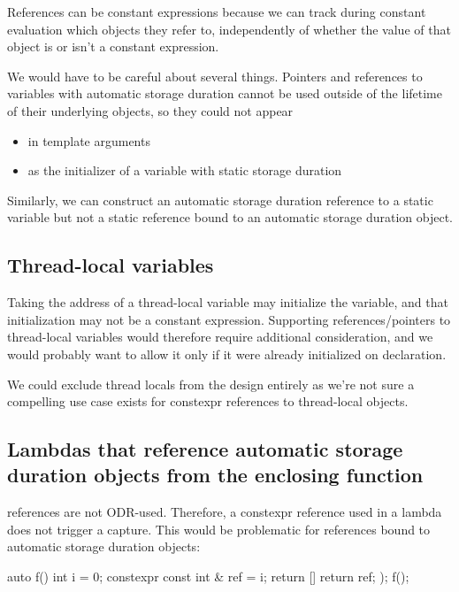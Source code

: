 \documentclass{wg21}
\begin{document}
References can be constant expressions because we can track during constant evaluation which objects they refer to, independently of whether the value of that object is or isn't a constant expression.

We would have to be careful about several things.
Pointers and references to variables with automatic storage duration cannot be used outside of the lifetime of their underlying objects, so they could not appear
\begin{itemize}
  \item in template arguments
  \item as the initializer of a variable with static storage duration
\end{itemize}

Similarly, we can construct an automatic storage duration  reference to a static variable but not a static  reference bound to an automatic storage duration object.

\subsection{Thread-local variables}

Taking the address of a thread-local variable may initialize the variable, and that initialization may not be a constant expression.
Supporting references/pointers to thread-local variables would therefore require additional consideration, and we would probably want to allow it only if it were  already initialized
on declaration.

We could exclude thread locals from the design entirely as we're not sure a compelling use case exists for constexpr references to thread-local objects.

\subsection{Lambdas that reference automatic storage duration objects from the enclosing function}

 references are not ODR-used.  Therefore, a constexpr reference used in a lambda does not trigger a capture.
This would be problematic for references bound to automatic storage duration objects:

\begin{colorblock}
auto f() {
    int i = 0;
    constexpr const int & ref = i;
    return [] {
        return ref;
    });
}
f();
\end{colorblock}
\end{document}
